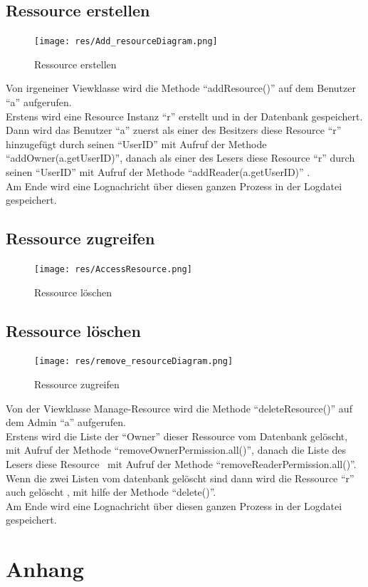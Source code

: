 \documentclass[parskip=full,11pt]{scrartcl}
\begin{document}
  \newpage
 \subsection{Ressource erstellen}
 \begin{figure}[ht!]
 	\centering
 	\texttt{[image: res/Add\_resourceDiagram.png]}
 	\caption{Ressource erstellen}
 \end{figure}
 
Von irgeneiner Viewklasse wird die Methode \enquote{addResource()} auf dem Benutzer \enquote{a}  aufgerufen.\\ Erstens wird eine Resource Instanz \enquote{r} erstellt und in der Datenbank gespeichert.\\ Dann wird das Benutzer \enquote{a} zuerst als einer des Besitzers diese Resource \enquote{r} hinzugefügt durch seinen \enquote{UserID} mit Aufruf der Methode \enquote{addOwner(a.getUserID)}, danach als einer des Lesers diese Resource \enquote{r} durch seinen \enquote{UserID} mit Aufruf der Methode \enquote{addReader(a.getUserID)} .\\Am Ende wird eine Lognachricht über diesen ganzen Prozess  in der Logdatei gespeichert.

 
 
  \newpage
    \newpage
 \subsection{Ressource zugreifen}
 \begin{figure}[ht!]
 	\centering
 	\texttt{[image: res/AccessResource.png]}
 	\caption{Ressource löschen}
 \end{figure}
 
 \subsection{Ressource löschen}
 \begin{figure}[ht!]
 	\centering
 	\texttt{[image: res/remove\_resourceDiagram.png]}
 	\caption{Ressource zugreifen}
 \end{figure}
 
 
 Von der Viewklasse Manage-Resource wird die Methode \enquote{deleteResource()} auf dem Admin \enquote{a}  aufgerufen.\\ Erstens wird die Liste der \enquote{Owner} dieser Ressource vom Datenbank gelöscht, mit Aufruf der Methode \enquote{removeOwnerPermission.all()}, danach die Liste des Lesers diese Resource \ mit Aufruf der Methode \enquote{removeReaderPermission.all()}.\\
 Wenn die zwei Listen vom datenbank gelöscht sind dann wird die Ressource \enquote{r} auch gelöscht , mit hilfe der Methode \enquote{delete()}.\\ Am Ende wird eine Lognachricht über diesen ganzen Prozess  in der Logdatei gespeichert.\\
 
 \newpage
 \section{Anhang}
 \newpage
{}
\printglossary	
	
 
\end{document}
